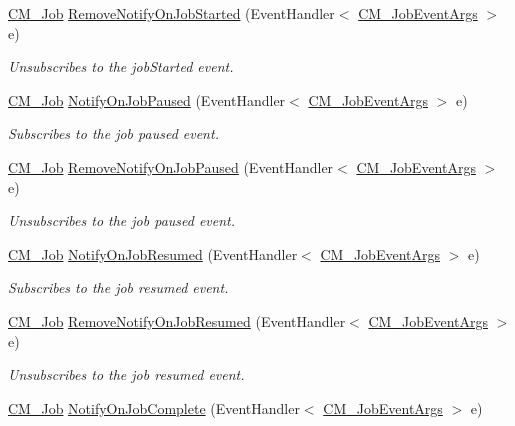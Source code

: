 \begin{DoxyCompactItemize}
\hyperlink{class_c_m___job}{C\+M\+\_\+\+Job} \hyperlink{class_c_m___job_a136e32ada03eaab4c526b553d973f36f}{Remove\+Notify\+On\+Job\+Started} (Event\+Handler$<$ \hyperlink{class_c_m___job_event_args}{C\+M\+\_\+\+Job\+Event\+Args} $>$ e)
\begin{DoxyCompactList}\small\item\em Unsubscribes to the job\+Started event. \end{DoxyCompactList}\item 
\hyperlink{class_c_m___job}{C\+M\+\_\+\+Job} \hyperlink{class_c_m___job_a656895b36f0619ae50563993c25cd8c0}{Notify\+On\+Job\+Paused} (Event\+Handler$<$ \hyperlink{class_c_m___job_event_args}{C\+M\+\_\+\+Job\+Event\+Args} $>$ e)
\begin{DoxyCompactList}\small\item\em Subscribes to the job paused event. \end{DoxyCompactList}\item 
\hyperlink{class_c_m___job}{C\+M\+\_\+\+Job} \hyperlink{class_c_m___job_a1d12a9e9f851bb722e00c5982ff1fd08}{Remove\+Notify\+On\+Job\+Paused} (Event\+Handler$<$ \hyperlink{class_c_m___job_event_args}{C\+M\+\_\+\+Job\+Event\+Args} $>$ e)
\begin{DoxyCompactList}\small\item\em Unsubscribes to the job paused event. \end{DoxyCompactList}\item 
\hyperlink{class_c_m___job}{C\+M\+\_\+\+Job} \hyperlink{class_c_m___job_a75f17a64e339db10f3b8fb75fb240a0b}{Notify\+On\+Job\+Resumed} (Event\+Handler$<$ \hyperlink{class_c_m___job_event_args}{C\+M\+\_\+\+Job\+Event\+Args} $>$ e)
\begin{DoxyCompactList}\small\item\em Subscribes to the job resumed event. \end{DoxyCompactList}\item 
\hyperlink{class_c_m___job}{C\+M\+\_\+\+Job} \hyperlink{class_c_m___job_ab6821efdd6ee49603d1148b80483ef23}{Remove\+Notify\+On\+Job\+Resumed} (Event\+Handler$<$ \hyperlink{class_c_m___job_event_args}{C\+M\+\_\+\+Job\+Event\+Args} $>$ e)
\begin{DoxyCompactList}\small\item\em Unsubscribes to the job resumed event. \end{DoxyCompactList}\item 
\hyperlink{class_c_m___job}{C\+M\+\_\+\+Job} \hyperlink{class_c_m___job_aad8e48e0d2fa17fde30ba76516dbf7bd}{Notify\+On\+Job\+Complete} (Event\+Handler$<$ \hyperlink{class_c_m___job_event_args}{C\+M\+\_\+\+Job\+Event\+Args} $>$ e)

\end{DoxyCompactItemize}
